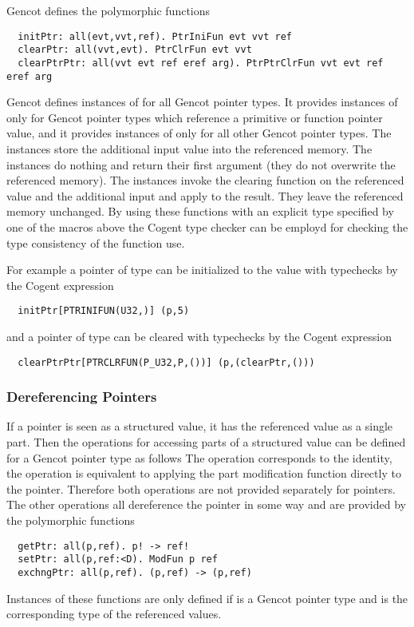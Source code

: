Gencot defines the polymorphic functions
\begin{verbatim}
  initPtr: all(evt,vvt,ref). PtrIniFun evt vvt ref
  clearPtr: all(vvt,evt). PtrClrFun evt vvt
  clearPtrPtr: all(vvt evt ref eref arg). PtrPtrClrFun vvt evt ref eref arg
\end{verbatim}
Gencot defines instances of  for all Gencot pointer types. It provides instances of  only for Gencot pointer types which
reference a primitive or function pointer value, and it provides instances of  only for all other Gencot pointer types.
The  instances store the additional input value 
into the referenced memory. The  instances do nothing and return their first argument (they do not overwrite the referenced memory).
The  instances invoke the clearing function on the referenced value and the additional input and apply  to the result.
They leave the referenced memory unchanged. By using these functions with an explicit type specified by one of the macros above the Cogent type 
checker can be employd for checking the type consistency of the function use.

For example a pointer  of type  can be initialized to the value  with typechecks by the Cogent expression
\begin{verbatim}
  initPtr[PTRINIFUN(U32,)] (p,5)
\end{verbatim}
and a pointer  of type  can be cleared with typechecks by the Cogent expression
\begin{verbatim}
  clearPtrPtr[PTRCLRFUN(P_U32,P,())] (p,(clearPtr,()))
\end{verbatim}

\subsubsection{Dereferencing Pointers}

If a pointer is seen as a structured value, it has the referenced value as a single part.
Then the operations for accessing parts of a structured value can be defined for a Gencot pointer type as follows
The operation  corresponds to the identity, the operation  is equivalent to applying the
part modification function directly to the pointer. Therefore both operations are not provided separately for pointers. 
The other operations all dereference the pointer in some way and are provided by the polymorphic functions
\begin{verbatim}
  getPtr: all(p,ref). p! -> ref! 
  setPtr: all(p,ref:<D). ModFun p ref
  exchngPtr: all(p,ref). (p,ref) -> (p,ref)
\end{verbatim}
Instances of these functions are only defined if  is a Gencot pointer type and  is the corresponding
type of the referenced values. 

